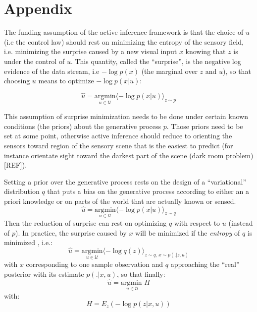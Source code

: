 \documentclass[12pt,twoside,openright]{article}
\begin{document}
		
	
	
	
\begin{footnotesize}


\end{footnotesize}	
	
\appendix
\section{Appendix}\label{appendix-friston}
{\color{magenta} The funding assumption of the active inference framework is that the choice of $u$ (i.e the control law) should rest on minimizing the entropy of the sensory field, i.e. minimizing the surprise caused by a new visual input $x$ knowing that $z$ is under the control of $u$. This quantity, called the ``surprise'', is the negative log evidence of the data stream, i.e $-\log p(x)$ (the marginal over $z$ and $u$), so that choosing $u$ means to optimize $-\log p(x|u)$:
	
	$$ \hat{u} = \underset{u \in \mathcal{U}}{\text{argmin}} \langle -\log p(x|u)\rangle_{z\sim p}$$
	
	This assumption of surprise minimization needs to be done under certain known conditions (the priors) about the generative process $p$. Those priors need to be set at some point, otherwise active inference should reduce to orienting the sensors toward region of the sensory scene that is the easiest to predict  (for instance orientate sight toward the darkest  part of the scene (dark room problem) [REF]). 
	
	
	Setting a prior over the generative process rests on the design of a ``variational'' distribution $q$ that puts a bias on the generative process according to either an a priori knowledge or on parts of the world that are actually known or sensed.
	$$ \hat{u} = \underset{u \in \mathcal{U}}{\text{argmin}} \langle -\log p(x|u)\rangle_{z\sim q}$$ 
	Then the reduction of surprise can rest on optimizing $q$ with respect to $u$ (instead of $p$).  In practice, the surprise caused by $x$ will be minimized if the \emph{entropy} of $q$ is minimized \cite{friston2012perceptions}, i.e.:
	$$ \hat{u} = \underset{u \in \mathcal{U}}{\text{argmin}} \langle -\log q(z)\rangle_{z \sim q\text{, }x\sim p(.|z,u)}$$ 
	with $x$ corresponding to one sample observation and $q$ approaching the ``real'' posterior with its estimate $p(.|x,u)$, so that finally:
	$$\hat{u} = \underset{u \in \mathcal{U}}{\text{argmin }} H$$ 
	with:
	$$H = E_z(-\log p(z|x,u))$$
}
\end{document}
